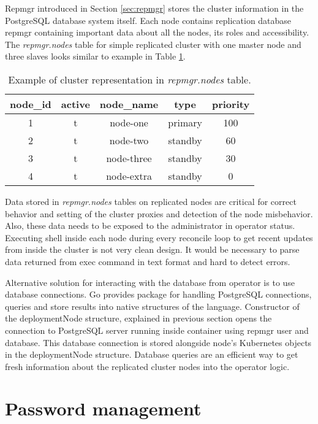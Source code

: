 \documentclass[
  digital, %
  twoside, %
  table,   %
  lof,     %
  lot,     %
]{fithesis3}
\begin{document}
Repmgr introduced in Section \ref{sec:repmgr} stores the cluster information in the PostgreSQL database system itself. Each node contains replication database repmgr containing important data about all the nodes, its roles and accessibility. The \textit{repmgr.nodes} table for simple replicated cluster with one master node and three slaves looks similar to example in Table \ref{table:repmgr_nodes}.

\begin{table}[ht!]
\centering
\begin{tabular}{|c c c c c|}
 \hline
 node\_id & active & node\_name & type & priority \\ [0.5ex]
 \hline
 1 & t & node-one & primary & 100 \\

 2 & t & node-two & standby & 60 \\

 3 & t & node-three & standby & 30 \\

 4 & t & node-extra & standby & 0 \\ [1ex]
 \hline
\end{tabular}
\caption{Example of cluster representation in \textit{repmgr.nodes} table.}
\label{table:repmgr_nodes}
\end{table}

Data stored in \textit{repmgr.nodes} tables on replicated nodes are critical for correct behavior and setting of the cluster proxies and detection of the node misbehavior. Also, these data needs to be exposed to the administrator in operator status. Executing shell inside each node during every reconcile loop to get recent updates from inside the cluster is not very clean design. It would be necessary to parse data returned from exec command in text format and hard to detect errors.

Alternative solution for interacting with the database from operator is to use database connections. Go provides package for handling PostgreSQL connections, queries and store results into native structures of the language. Constructor of the deploymentNode structure, explained in previous section opens the connection to PostgreSQL server running inside container using repmgr user and database. This database connection is stored alongside node's Kubernetes objects in the deploymentNode structure. Database queries are an efficient way to get fresh information about the replicated cluster nodes into the operator logic.

\section{Password management}
\end{document}
